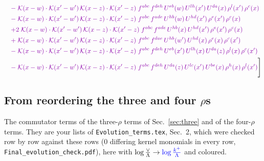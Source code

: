 \documentclass[10pt]{article}
\numberwithin{equation}{section}
\newcommand{\new}[1]{{\color{blue}#1}}
\begin{document}
\begin{align}
&\quad{\color{CC}-\;\mathcal{K}(x-w)\cdot\mathcal{K}(x'-w')\,\mathcal{K}(x-z)\cdot\mathcal{K}(x'-z)\;f^{abc}\,f^{deh}\,U^{eb}(w)\,U^{lh}(x')\,U^{da}(x)\,\rho^{l}(x')\,\rho^{c}(x)}\notag\\
&\quad{\color{CC}-\;\mathcal{K}(x-w)\cdot\mathcal{K}(x'-w')\,\mathcal{K}(x-z)\cdot\mathcal{K}(x'-z)\;f^{abc}\,f^{ade}\,U^{hb}(w)\,U^{hd}(x')\,\rho^{e}(x')\,\rho^{c}(x)}\notag\\
&\quad{\color{CC}+2\;\mathcal{K}(x-w)\cdot\mathcal{K}(x'-w')\,\mathcal{K}(x-z)\cdot\mathcal{K}(x'-z)\;f^{abc}\,f^{ade}\,U^{hb}(x)\,U^{hd}(x')\,\rho^{e}(x')\,\rho^{c}(x)}\notag\\
&\quad{\color{CC}+\;\mathcal{K}(x-w)\cdot\mathcal{K}(x'-w')\,\mathcal{K}(x-z)\cdot\mathcal{K}(x'-z)\;f^{abc}\,f^{dae}\,U^{hb}(w')\,U^{hd}(x)\,\rho^{e}(x)\,\rho^{c}(x')}\notag\\
&\quad{\color{CC}-\;\mathcal{K}(x-w)\cdot\mathcal{K}(x'-w')\,\mathcal{K}(x-z)\cdot\mathcal{K}(x'-z)\;f^{abc}\,f^{deh}\,U^{eb}(x')\,U^{lh}(x)\,U^{da}(z)\,\rho^{l}(x)\,\rho^{c}(x')}\notag\\
&\quad{\color{CC}-\;\mathcal{K}(x-w)\cdot\mathcal{K}(x'-w')\,\mathcal{K}(x-z)\cdot\mathcal{K}(x'-z)\;f^{abc}\,f^{deh}\,U^{da}(z)\,U^{lc}(x')\,U^{be}(x)\,\rho^{h}(x)\,\rho^{l}(x')}\Bigg]\label{eq:fourlists}
\end{align}

\subsection{From reordering the three and four $\rho$\textquotesingle s}
The commutator terms of the three-$\rho$ terms of Sec.~\ref{sec:three} and of the four-$\rho$ terms. They are your lists of \texttt{Evolution\_terms.tex}, Sec.~2, which were checked row by row against these rows (0 differing kernel monomials in every row, \texttt{Final\_evolution\_check.pdf}), here with $\log\frac{\vee}{\Lambda}\to\new{\log\frac{k^+}{\Lambda}}$ and coloured.
\end{document}
